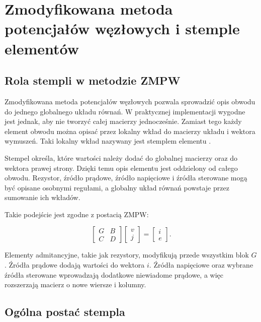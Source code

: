 \chapter{Zmodyfikowana metoda potencjałów węzłowych i stemple elementów}
\label{chap:mna}

\section{Rola stempli w metodzie ZMPW}
\label{sec:rola-stempli}

Zmodyfikowana metoda potencjałów węzłowych pozwala sprowadzić opis obwodu do jednego globalnego układu równań. W praktycznej implementacji wygodne jest jednak, aby nie tworzyć całej macierzy jednocześnie. Zamiast tego każdy element obwodu można opisać przez lokalny wkład do macierzy układu i wektora wymuszeń. Taki lokalny wkład nazywany jest stemplem elementu \cite{ho1975mna,vlach1994computer}.

Stempel określa, które wartości należy dodać do globalnej macierzy oraz do wektora prawej strony. Dzięki temu opis elementu jest oddzielony od całego obwodu. Rezystor, źródło prądowe, źródło napięciowe i źródła sterowane mogą być opisane osobnymi regułami, a globalny układ równań powstaje przez sumowanie ich wkładów.

Takie podejście jest zgodne z postacią ZMPW:

\begin{equation}
\label{eq:stamps-mna-system}
\begin{bmatrix}
G & B \\
C & D
\end{bmatrix}
\begin{bmatrix}
v \\
j
\end{bmatrix}
=
\begin{bmatrix}
i \\
e
\end{bmatrix}.
\end{equation}

Elementy admitancyjne, takie jak rezystory, modyfikują przede wszystkim blok \(G\). Źródła prądowe dodają wartości do wektora \(i\). Źródła napięciowe oraz wybrane źródła sterowane wprowadzają dodatkowe niewiadome prądowe, a więc rozszerzają macierz o nowe wiersze i kolumny.

\section{Ogólna postać stempla}
\label{sec:ogolna-postac-stempla}

